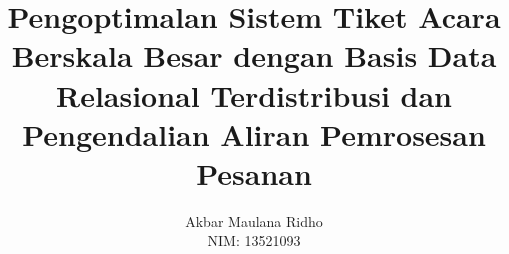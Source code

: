 \documentclass[bahasa, 12pt, a4paper, onecolumn, oneside, final]{report}
\begin{document}
\title{Pengoptimalan Sistem Tiket Acara Berskala Besar dengan Basis Data Relasional Terdistribusi dan Pengendalian Aliran Pemrosesan Pesanan}
\date{}
\author{
  Akbar Maulana Ridho \\
  NIM: 13521093
}
\newcommand\tanggalpengesahan{31 Juli 2025}

\setcounter{page}{1}





\pagestyle{plain}





\titlespacing*{\chapter}{0pt}{0pt}{4pt}

\renewcommand{\contentsname}{DAFTAR ISI}
\renewcommand{\listfigurename}{DAFTAR GAMBAR}
\renewcommand{\listtablename}{DAFTAR TABEL}
\renewcommand{\bibname}{DAFTAR PUSTAKA}

\tableofcontents
\listofappendices
\listoffigures
\listoftables

\newpage


\setcounter{page}{1}
\renewcommand{\chaptername}{BAB}
\renewcommand{\thechapter}{\Roman{chapter}}


\titlespacing*{\section}{0pt}{12pt}{8pt}
\titlespacing*{\section}{0pt}{8pt}{6pt}
\titlespacing*{\section}{0pt}{6pt}{4pt}
\end{document}
